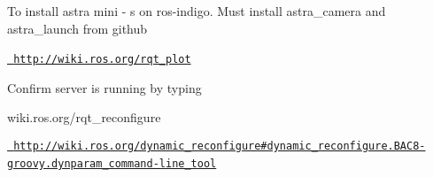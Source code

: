 To install astra mini -\/ s on ros-\/indigo. Must install astra\+\_\+camera and astra\+\_\+launch from github 
\begin{DoxyCode}{0}
\end{DoxyCode}


\href{http://wiki.ros.org/rqt_plot}{\texttt{ http\+://wiki.\+ros.\+org/rqt\+\_\+plot}} ~\newline

\begin{DoxyCode}{0}
\end{DoxyCode}


Confirm server is running by typing ~\newline

\begin{DoxyCode}{0}
\end{DoxyCode}



\begin{DoxyCode}{0}
\end{DoxyCode}


wiki.\+ros.\+org/rqt\+\_\+reconfigure ~\newline

\begin{DoxyCode}{0}
\end{DoxyCode}


\href{http://wiki.ros.org/dynamic_reconfigure\#dynamic_reconfigure.2BAC8-groovy.dynparam_command-line_tool}{\texttt{ http\+://wiki.\+ros.\+org/dynamic\+\_\+reconfigure\#dynamic\+\_\+reconfigure.\+B\+A\+C8-\/groovy.\+dynparam\+\_\+command-\/line\+\_\+tool}} ~\newline
 